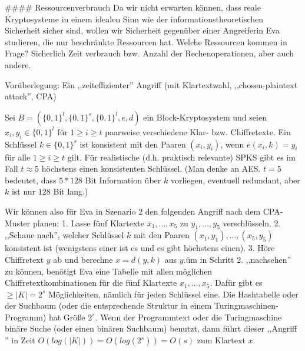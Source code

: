 \documentclass[a4paper]{article}
\begin{document}
\begin{multicols}{3}
        #### Ressourcenverbrauch
        Da wir nicht erwarten können, dass reale Kryptosysteme in einem idealen Sinn wie der informationstheoretischen Sicherheit sicher sind, wollen wir Sicherheit gegenüber einer Angreiferin Eva studieren, die nur beschränkte Ressourcen hat. Welche Ressourcen kommen in Frage? Sicherlich Zeit verbrauch bzw. Anzahl der Rechenoperationen, aber auch andere.

        Vorüberlegung: Ein ,,zeiteffizienter'' Angriff (mit Klartextwahl, ,,chosen-plaintext attack'', CPA)

        Sei $B=(\{0,1\}^l,\{0,1\}^s,\{0,1\}^l,e,d)$ ein Block-Kryptosystem und seien $x_i,y_i\in\{0,1\}^l$ für $1\geq i\geq t$ paarweise verschiedene Klar- bzw. Chiffretexte. Ein Schlüssel $k\in\{0,1\}^s$ ist konsistent mit den Paaren $(x_i,y_i)$, wenn $e(x_i,k)=y_i$ für alle $1\geq i\geq t$ gilt. Für realistische (d.h. praktisch relevante) SPKS gibt es im Fall $t\approx 5$ höchstens einen konsistenten Schlüssel. (Man denke an AES. $t=5$ bedeutet, dass $5*128$ Bit Information über $k$ vorliegen, eventuell redundant, aber $k$ ist nur $128$ Bit lang.)

        Wir können also für Eva in Szenario 2 den folgenden Angriff nach dem CPA-Muster planen:
        1. Lasse fünf Klartexte $x_1,...,x_5$ zu $y_1,...,y_5$ verschlüsseln.
        2. ,,Schaue nach'', welcher Schlüssel $k$ mit den Paaren $(x_1,y_1),...,(x_5,y_5)$ konsistent ist (wenigstens einer ist es und es gibt höchstens einen).
        3. Höre Chiffretext $y$ ab und berechne $x=d(y,k)$ aus $y$.üm in Schritt 2. ,,nachsehen'' zu können, benötigt Eva eine Tabelle mit allen möglichen Chiffretextkombinationen für die fünf Klartexte $x_1,...,x_5$. Dafür gibt es $\geq |K|= 2^s$ Möglichkeiten, nämlich für jeden Schlüssel eine. Die Hashtabelle oder der Suchbaum (oder die entsprechende Struktur in einem Turingmaschinen-Programm) hat Größe $2^s$. Wenn der Programmtext oder die Turingmaschine binäre Suche (oder einen binären Suchbaum) benutzt, dann führt dieser ,,Angriff '' in Zeit $O(log(|K|)) =O(log(2^s)) =O(s)$ zum Klartext $x$.


\end{multicols}
\end{document}
